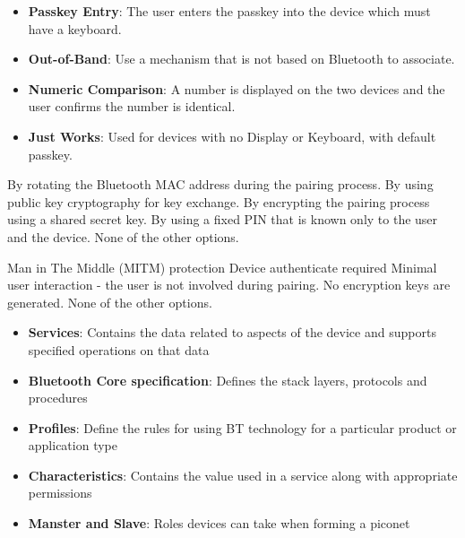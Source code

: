 \begin{solution}
    \begin{itemize}
        \item \textbf{Passkey Entry}: The user enters the passkey into the device which must have a keyboard.
        \item \textbf{Out-of-Band}: Use a mechanism that is not based on Bluetooth to associate.
        \item \textbf{Numeric Comparison}: A number is displayed on the two devices and the user confirms the number is identical.
        \item \textbf{Just Works}: Used for devices with no Display or Keyboard, with default passkey.
    \end{itemize}
\end{solution}

\begin{checkboxes}
    \choice By rotating the Bluetooth MAC address during the pairing process.
    \choice By using public key cryptography for key exchange.
    \CorrectChoice By encrypting the pairing process using a shared secret key.
    \choice By using a fixed PIN that is known only to the user and the device.
    \choice None of the other options.
\end{checkboxes}

\begin{checkboxes}
    \CorrectChoice Man in The Middle (MITM) protection
    \CorrectChoice Device authenticate required
    \choice Minimal user interaction - the user is not involved during pairing.
    \choice No encryption keys are generated.
    \choice None of the other options.
\end{checkboxes}

\begin{solution}
    \begin{itemize}
        \item \textbf{Services}: Contains the data related to aspects of the device and supports specified operations on that data
        \item \textbf{Bluetooth Core specification}: Defines the stack layers, protocols and procedures
        \item \textbf{Profiles}: Define the rules for using BT technology for a particular product or application type
        \item \textbf{Characteristics}: Contains the value used in a service along with appropriate permissions
        \item \textbf{Manster and Slave}: Roles devices can take when forming a piconet
    \end{itemize}
\end{solution}

